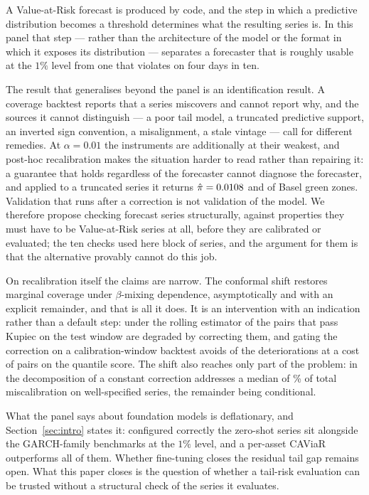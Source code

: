 \documentclass[preprint,11pt,authoryear]{elsarticle}
\newcommand{\1}{\boldsymbol{1}}
\begin{document}
A Value-at-Risk forecast is produced by code, and the step in which a predictive
distribution becomes a threshold determines what the resulting series is. In this
panel that step --- rather than the architecture of the model or the format in
which it exposes its distribution --- separates a forecaster that is roughly
usable at the $1\%$ level from one that violates on four days in ten.

The result that generalises beyond the panel is an identification result. A
coverage backtest reports that a series miscovers and cannot report why, and the
sources it cannot distinguish --- a poor tail model, a truncated predictive
support, an inverted sign convention, a misalignment, a stale vintage --- call
for different remedies. At $\alpha = 0.01$ the instruments are additionally at
their weakest, and post-hoc recalibration makes the situation harder to read
rather than repairing it: a guarantee that holds regardless of the forecaster
cannot diagnose the forecaster, and applied to a truncated series it returns
$\hat\pi = 0.0108$ and \nTruncCorGreen{} of \nMainAssets{} Basel green
zones. Validation that runs after a correction is not validation of the model.
We therefore propose checking forecast series structurally, against properties
they must have to be Value-at-Risk series at all, before they are calibrated or
evaluated; the ten checks used here block \nGateBlocked{} of \nGateSeries{}
series, and the argument for them is that the alternative provably cannot do this
job.

On recalibration itself the claims are narrow. The conformal shift restores
marginal coverage under $\beta$-mixing dependence, asymptotically and with an
explicit remainder, and that is all it does. It is an intervention with an
indication rather than a default step: under the rolling estimator
\nWellCalRollWorse{} of the \nWellCalRollN{} pairs that pass Kupiec on the test
window are degraded by correcting them, and gating the correction on a
calibration-window backtest avoids \nGateRollAvoided{} of the \nDegradedRoll{}
deteriorations at a cost of \nGateRollUpgradesLostNet{} pairs on the quantile
score. The shift also reaches only part of the problem: in the decomposition of
\citet{gneiting2023regression} a constant correction addresses a median of
\nuMCBSharePct\% of total miscalibration on well-specified series, the remainder
being conditional.

What the panel says about foundation models is deflationary, and
Section~\ref{sec:intro} states it: configured correctly the zero-shot series sit
alongside the GARCH-family benchmarks at the $1\%$ level, and a per-asset CAViaR
outperforms all of them. Whether fine-tuning closes the residual tail gap remains
open. What this paper closes is the question of whether a tail-risk evaluation
can be trusted without a structural check of the series it evaluates.
\end{document}
